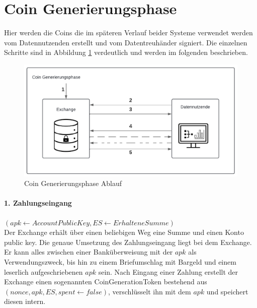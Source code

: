 \documentclass[11pt,a4paper]{scrreprt}
\begin{document}
\section{Coin Generierungsphase}
Hier werden die Coins die im späteren Verlauf beider Systeme verwendet werden vom Datennutzenden erstellt und vom Datentreuhänder signiert. Die einzelnen Schritte sind in Abbildung \ref{fig:coin-generationphase} verdeutlich und werden im folgenden beschrieben.
\begin{figure}
    \centering
    \includegraphics[width=0.9\linewidth]{CoinGenerationPhaseDiagramm.pdf}
    \caption{Coin Generierungsphase Ablauf}
    \label{fig:coin-generationphase}
\end{figure}


\paragraph{1. Zahlungseingang} $(apk \leftarrow AccountPublicKey, ES \leftarrow ErhalteneSumme)$\\
Der Exchange erhält über einen beliebigen Weg eine Summe und einen Konto public key. Die genaue Umsetzung des Zahlungseingang liegt bei dem Exchange. Er kann alles zwischen einer Banküberweisung mit der $apk$ als Verwendungszweck, bis hin zu einem Briefumschlag mit Bargeld und einem leserlich aufgeschriebenen $apk$ sein. Nach Eingang einer Zahlung erstellt der Exchange einen sogenannten CoinGenerationToken bestehend aus $(nonce, apk, ES, spent \leftarrow false)$, verschlüsselt ihn mit dem $apk$ und speichert diesen intern.
\end{document}
